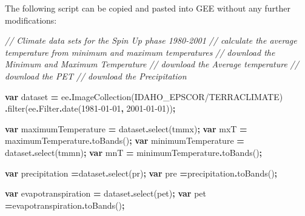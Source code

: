 \documentclass[
  10pt,
  b5paper,
]{book}
\newenvironment{Shaded}{\begin{snugshade}}{\end{snugshade}}
\newcommand{\AttributeTok}[1]{\textcolor[rgb]{0.77,0.63,0.00}{#1}}
\newcommand{\CommentTok}[1]{\textcolor[rgb]{0.56,0.35,0.01}{\textit{#1}}}
\newcommand{\FunctionTok}[1]{\textcolor[rgb]{0.00,0.00,0.00}{#1}}
\newcommand{\KeywordTok}[1]{\textcolor[rgb]{0.13,0.29,0.53}{\textbf{#1}}}
\newcommand{\NormalTok}[1]{#1}
\newcommand{\OperatorTok}[1]{\textcolor[rgb]{0.81,0.36,0.00}{\textbf{#1}}}
\newcommand{\StringTok}[1]{\textcolor[rgb]{0.31,0.60,0.02}{#1}}
\begin{document}
The following script can be copied and pasted into GEE without any further modifications:

\begin{Shaded}
\begin{Highlighting}[]
\CommentTok{// Climate data sets for the Spin Up phase 1980{-}2001}
\CommentTok{// calculate the average temperature from minimum and maximum temperatures}
\CommentTok{// download the Minimum and Maximum Temperature }
\CommentTok{// download the Average temperature}
\CommentTok{// download the PET }
\CommentTok{// download the Precipitation}

\KeywordTok{var}\NormalTok{ dataset }\OperatorTok{=}\NormalTok{ ee}\OperatorTok{.}\FunctionTok{ImageCollection}\NormalTok{(}\StringTok{\textquotesingle{}IDAHO\_EPSCOR/TERRACLIMATE\textquotesingle{}}\NormalTok{)}
                  \OperatorTok{.}\FunctionTok{filter}\NormalTok{(ee}\OperatorTok{.}\AttributeTok{Filter}\OperatorTok{.}\FunctionTok{date}\NormalTok{(}\StringTok{\textquotesingle{}1981{-}01{-}01\textquotesingle{}}\OperatorTok{,} \StringTok{\textquotesingle{}2001{-}01{-}01\textquotesingle{}}\NormalTok{))}\OperatorTok{;}

\KeywordTok{var}\NormalTok{ maximumTemperature }\OperatorTok{=}\NormalTok{ dataset}\OperatorTok{.}\FunctionTok{select}\NormalTok{(}\StringTok{\textquotesingle{}tmmx\textquotesingle{}}\NormalTok{)}\OperatorTok{;}
\KeywordTok{var}\NormalTok{ mxT }\OperatorTok{=}\NormalTok{ maximumTemperature}\OperatorTok{.}\FunctionTok{toBands}\NormalTok{()}\OperatorTok{;}
\KeywordTok{var}\NormalTok{ minimumTemperature }\OperatorTok{=}\NormalTok{ dataset}\OperatorTok{.}\FunctionTok{select}\NormalTok{(}\StringTok{\textquotesingle{}tmmn\textquotesingle{}}\NormalTok{)}\OperatorTok{;}
\KeywordTok{var}\NormalTok{ mnT }\OperatorTok{=}\NormalTok{ minimumTemperature}\OperatorTok{.}\FunctionTok{toBands}\NormalTok{()}\OperatorTok{;}

\KeywordTok{var}\NormalTok{ precipitation }\OperatorTok{=}\NormalTok{dataset}\OperatorTok{.}\FunctionTok{select}\NormalTok{(}\StringTok{\textquotesingle{}pr\textquotesingle{}}\NormalTok{)}\OperatorTok{;}
\KeywordTok{var}\NormalTok{ pre }\OperatorTok{=}\NormalTok{precipitation}\OperatorTok{.}\FunctionTok{toBands}\NormalTok{()}\OperatorTok{;}

\KeywordTok{var}\NormalTok{ evapotranspiration }\OperatorTok{=}\NormalTok{ dataset}\OperatorTok{.}\FunctionTok{select}\NormalTok{(}\StringTok{\textquotesingle{}pet\textquotesingle{}}\NormalTok{)}\OperatorTok{;}
\KeywordTok{var}\NormalTok{ pet }\OperatorTok{=}\NormalTok{evapotranspiration}\OperatorTok{.}\FunctionTok{toBands}\NormalTok{()}\OperatorTok{;}


\end{Highlighting}
\end{Shaded}
\end{document}
